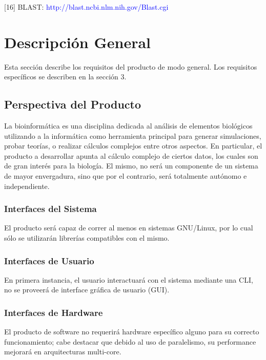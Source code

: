 \documentclass[12pt,a4paper,english,spanish]{article}
\begin{document}
[16] BLAST: \textcolor{blue}{http://blast.ncbi.nlm.nih.gov/Blast.cgi}

\section{Descripción General}
\label{section-desc-gral}
Esta sección describe los requisitos del producto de modo general. Los
requisitos específicos se describen en la sección 3.

\subsection{Perspectiva del Producto}
La bioinformática es una disciplina dedicada al análisis de elementos biológicos utilizando a la informática como herramienta principal para generar simulaciones, probar teorías, o realizar cálculos complejos entre otros aspectos. En particular, el producto a desarrollar apunta al cálculo complejo de ciertos datos, los cuales son de gran interés para la biología. El mismo, no será un componente de un sistema de mayor envergadura, sino que por el contrario, será totalmente autónomo e independiente. 

	\subsubsection{Interfaces del Sistema}
		El producto será capaz de correr al menos en sistemas GNU/Linux, por lo cual sólo se utilizarán librerías 			compatibles con el mismo.

	\subsubsection{Interfaces de Usuario}		
		En primera instancia, el usuario interactuará con el sistema mediante una CLI, no se proveerá de interface gráfica de usuario (GUI).

	\subsubsection{Interfaces de Hardware}
		El producto de software no requerirá hardware específico alguno para su correcto funcionamiento; cabe destacar 	que debido al uso de paralelismo, 			su performance mejorará en arquitecturas multi-core.
\end{document}
